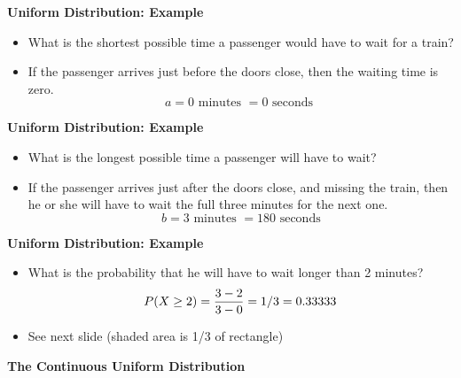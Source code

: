 {
\textbf{Uniform Distribution: Example}

\begin{itemize}
 \item What is the shortest possible time a passenger would have to wait for a train?
\item If the passenger arrives just before the doors close, then the waiting time is zero.
\[ a = 0 \mbox{ minutes } = 0 \mbox{ seconds }  \]
\end{itemize}
}


{
\textbf{Uniform Distribution: Example}

\begin{itemize}
\item What is the longest possible time a passenger will have to wait?
\item If the passenger arrives just after the doors close, and missing the train, then he or she will have to wait the full three minutes for the next one.
\[ b = 3 \mbox{ minutes }  = 180 \mbox{ seconds}  \]
\end{itemize}

}

{
\textbf{Uniform Distribution: Example}

\begin{itemize}
\item What is the probability that he will have to wait longer than 2 minutes?
\[ P(X \geq 2)  = {3-2 \over 3-0} = {1/3} = 0.33333   \]
\item See next slide (shaded area is 1/3 of rectangle)
\end{itemize}

}


\textbf{The Continuous Uniform Distribution}



